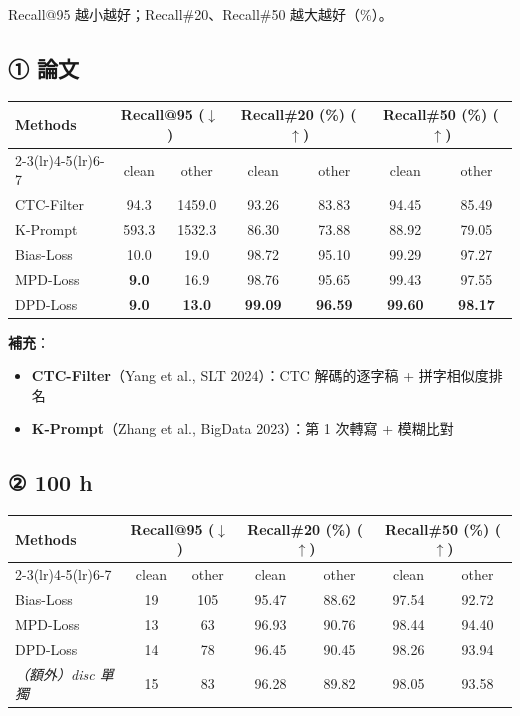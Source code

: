 \documentclass[11pt,a4paper]{article}
\begin{document}
Recall@95 越小越好；Recall\#20、Recall\#50 越大越好（\%）。

\subsection*{① 論文}

\begin{center}
\begin{tabular}{lcccccc}
\toprule
\multirow{2}{*}{\textbf{Methods}} & \multicolumn{2}{c}{\textbf{Recall@95} ($\downarrow$)} & \multicolumn{2}{c}{\textbf{Recall\#20} (\%) ($\uparrow$)} & \multicolumn{2}{c}{\textbf{Recall\#50} (\%) ($\uparrow$)} \\
\cmidrule(lr){2-3}\cmidrule(lr){4-5}\cmidrule(lr){6-7}
 & clean & other & clean & other & clean & other \\
\midrule
CTC-Filter & 94.3 & 1459.0 & 93.26 & 83.83 & 94.45 & 85.49 \\
K-Prompt   & 593.3 & 1532.3 & 86.30 & 73.88 & 88.92 & 79.05 \\
\midrule
Bias-Loss  & 10.0 & 19.0 & 98.72 & 95.10 & 99.29 & 97.27 \\
MPD-Loss   & \textbf{9.0} & 16.9 & 98.76 & 95.65 & 99.43 & 97.55 \\
DPD-Loss   & \textbf{9.0} & \textbf{13.0} & \textbf{99.09} & \textbf{96.59} & \textbf{99.60} & \textbf{98.17} \\
\bottomrule
\end{tabular}
\end{center}

\textbf{補充}：
\begin{itemize}[leftmargin=1.5em, itemsep=0pt]
  \item \textbf{CTC-Filter}（Yang et al., SLT 2024）：CTC 解碼的逐字稿 + 拼字相似度排名
  \item \textbf{K-Prompt}（Zhang et al., BigData 2023）：第 1 次轉寫 + 模糊比對
\end{itemize}

\subsection*{② 100 h}

\begin{center}
\begin{tabular}{lcccccc}
\toprule
\multirow{2}{*}{\textbf{Methods}} & \multicolumn{2}{c}{\textbf{Recall@95} ($\downarrow$)} & \multicolumn{2}{c}{\textbf{Recall\#20} (\%) ($\uparrow$)} & \multicolumn{2}{c}{\textbf{Recall\#50} (\%) ($\uparrow$)} \\
\cmidrule(lr){2-3}\cmidrule(lr){4-5}\cmidrule(lr){6-7}
 & clean & other & clean & other & clean & other \\
\midrule
Bias-Loss & 19 & 105 & 95.47 & 88.62 & 97.54 & 92.72 \\
MPD-Loss  & 13 & 63 & 96.93 & 90.76 & 98.44 & 94.40 \\
DPD-Loss  & 14 & 78 & 96.45 & 90.45 & 98.26 & 93.94 \\
\midrule
\textit{（額外）disc 單獨} & 15 & 83 & 96.28 & 89.82 & 98.05 & 93.58 \\
\bottomrule
\end{tabular}
\end{center}
\end{document}
